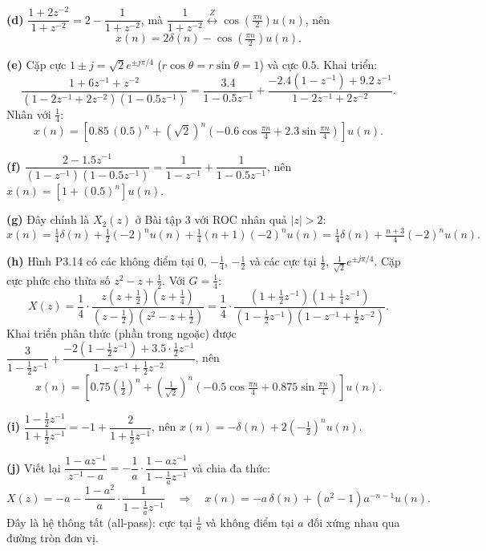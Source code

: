\documentclass[12pt,a4paper]{article}
\newcommand{\zpair}{\overset{Z}{\longleftrightarrow}}
\begin{document}
\textbf{(d)} $\dfrac{1 + 2z^{-2}}{1 + z^{-2}} = 2 - \dfrac{1}{1 + z^{-2}}$, mà $\dfrac{1}{1 + z^{-2}} \zpair \cos\left(\frac{\pi n}{2}\right)u(n)$, nên
\[
    x(n) = 2\delta(n) - \cos\left(\tfrac{\pi n}{2}\right) u(n).
\]

\textbf{(e)} Cặp cực $1 \pm j = \sqrt{2}e^{\pm j\pi/4}$ ($r\cos\theta = r\sin\theta = 1$) và cực $0.5$. Khai triển:
\[
    \frac{1 + 6z^{-1} + z^{-2}}{(1 - 2z^{-1} + 2z^{-2})(1 - 0.5z^{-1})} = \frac{3.4}{1 - 0.5z^{-1}} + \frac{-2.4(1 - z^{-1}) + 9.2\, z^{-1}}{1 - 2z^{-1} + 2z^{-2}}.
\]
Nhân với $\frac{1}{4}$:
\[
    x(n) = \left[0.85\,(0.5)^n + (\sqrt{2})^n\left(-0.6\cos\tfrac{\pi n}{4} + 2.3\sin\tfrac{\pi n}{4}\right)\right] u(n).
\]

\textbf{(f)} $\dfrac{2 - 1.5z^{-1}}{(1 - z^{-1})(1 - 0.5z^{-1})} = \dfrac{1}{1 - z^{-1}} + \dfrac{1}{1 - 0.5z^{-1}}$, nên $x(n) = \left[1 + (0.5)^n\right] u(n)$.

\textbf{(g)} Đây chính là $X_2(z)$ ở Bài tập 3 với ROC nhân quả $|z| > 2$:
\[
    x(n) = \tfrac{1}{4}\delta(n) + \tfrac{1}{2}(-2)^n u(n) + \tfrac{1}{4}(n+1)(-2)^n u(n) = \tfrac{1}{4}\delta(n) + \tfrac{n+3}{4}(-2)^n u(n).
\]

\textbf{(h)} Hình P3.14 có các không điểm tại $0$, $-\frac{1}{4}$, $-\frac{1}{2}$ và các cực tại $\frac{1}{2}$, $\frac{1}{\sqrt{2}}e^{\pm j\pi/4}$. Cặp cực phức cho thừa số $z^2 - z + \frac{1}{2}$. Với $G = \frac{1}{4}$:
\[
    X(z) = \frac{1}{4}\cdot\frac{z\left(z + \frac{1}{2}\right)\left(z + \frac{1}{4}\right)}{\left(z - \frac{1}{2}\right)\left(z^2 - z + \frac{1}{2}\right)}
    = \frac{1}{4}\cdot\frac{\left(1 + \frac{1}{2}z^{-1}\right)\left(1 + \frac{1}{4}z^{-1}\right)}{\left(1 - \frac{1}{2}z^{-1}\right)\left(1 - z^{-1} + \frac{1}{2}z^{-2}\right)}.
\]
Khai triển phân thức (phần trong ngoặc) được $\dfrac{3}{1 - \frac{1}{2}z^{-1}} + \dfrac{-2\left(1 - \frac{1}{2}z^{-1}\right) + 3.5 \cdot \frac{1}{2}z^{-1}}{1 - z^{-1} + \frac{1}{2}z^{-2}}$, nên
\[
    x(n) = \left[0.75\left(\tfrac{1}{2}\right)^n + \left(\tfrac{1}{\sqrt{2}}\right)^n\left(-0.5\cos\tfrac{\pi n}{4} + 0.875\sin\tfrac{\pi n}{4}\right)\right] u(n).
\]

\textbf{(i)} $\dfrac{1 - \frac{1}{2}z^{-1}}{1 + \frac{1}{2}z^{-1}} = -1 + \dfrac{2}{1 + \frac{1}{2}z^{-1}}$, nên $x(n) = -\delta(n) + 2\left(-\frac{1}{2}\right)^n u(n)$.

\textbf{(j)} Viết lại $\dfrac{1 - a z^{-1}}{z^{-1} - a} = -\dfrac{1}{a}\cdot\dfrac{1 - a z^{-1}}{1 - \frac{1}{a}z^{-1}}$ và chia đa thức:
\[
    X(z) = -a - \frac{1 - a^2}{a}\cdot\frac{1}{1 - \frac{1}{a}z^{-1}}
    \quad\Longrightarrow\quad
    x(n) = -a\,\delta(n) + \left(a^2 - 1\right) a^{-n-1} u(n).
\]
Đây là hệ thông tất (all-pass): cực tại $\frac{1}{a}$ và không điểm tại $a$ đối xứng nhau qua đường tròn đơn vị.
\end{document}
